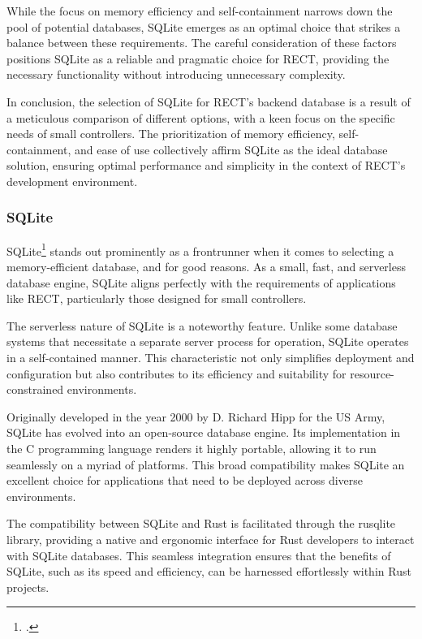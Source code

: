 While the focus on memory efficiency and self-containment narrows down the pool of potential databases, SQLite emerges as an optimal choice that strikes a 
balance between these requirements. The careful consideration of these factors positions SQLite as a reliable and pragmatic choice for RECT, providing the 
necessary functionality without introducing unnecessary complexity.\newline

In conclusion, the selection of SQLite for RECT's backend database is a result of a meticulous comparison of different options, with a keen focus on the 
specific needs of small controllers. The prioritization of memory efficiency, self-containment, and ease of use collectively affirm SQLite as the ideal database 
solution, ensuring optimal performance and simplicity in the context of RECT's development environment.

\subsubsection{SQLite}
SQLite\footcite{sqlite} stands out prominently as a frontrunner when it comes to selecting a memory-efficient database, and for good reasons. As a small, fast, 
and serverless database engine, SQLite aligns perfectly with the requirements of applications like RECT, particularly those designed for small controllers.\newline

The serverless nature of SQLite is a noteworthy feature. Unlike some database systems that necessitate a separate server process for operation, SQLite operates 
in a self-contained manner. This characteristic not only simplifies deployment and configuration but also contributes to its efficiency and suitability for 
resource-constrained environments.\newline

Originally developed in the year 2000 by D. Richard Hipp for the US Army, SQLite has evolved into an open-source database engine. Its implementation in the C 
programming language renders it highly portable, allowing it to run seamlessly on a myriad of platforms. This broad compatibility makes SQLite an excellent 
choice for applications that need to be deployed across diverse environments.\newline

The compatibility between SQLite and Rust is facilitated through the rusqlite library, providing a native and ergonomic interface for Rust developers to 
interact with SQLite databases. This seamless integration ensures that the benefits of SQLite, such as its speed and efficiency, can be harnessed effortlessly 
within Rust projects.\newline

